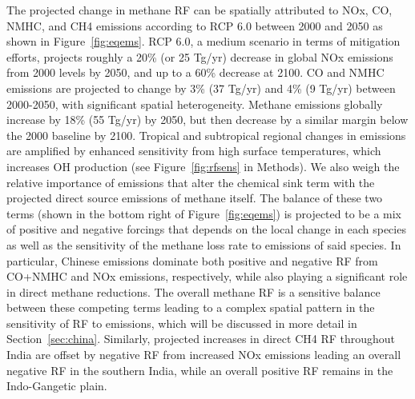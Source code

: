 The projected change in methane RF can be spatially attributed to NOx, CO, NMHC, and CH4 emissions according to RCP 6.0 between 2000 and 2050 as shown in Figure~\ref{fig:eqems}. RCP 6.0, a medium scenario in terms of mitigation efforts, projects roughly a 20\% (or 25 Tg/yr) decrease in global NOx emissions from 2000 levels by 2050, and up to a 60\% decrease at 2100. CO and NMHC emissions are projected to change by 3\% (37 Tg/yr) and 4\% (9 Tg/yr) between 2000-2050, with significant spatial heterogeneity. Methane emissions globally increase by 18\% (55 Tg/yr) by 2050, but then decrease by a similar margin below the 2000 baseline by 2100. Tropical and subtropical regional changes in emissions are amplified by enhanced sensitivity from high surface temperatures, which increases OH production (see Figure~\ref{fig:rfsens} in Methods). We also weigh the relative importance of emissions that alter the chemical sink term with the projected direct source emissions of methane itself. The balance of these two terms (shown in the bottom right of Figure~\ref{fig:eqems}) is projected to be a mix of positive and negative forcings that depends on the local change in each species as well as the sensitivity of the methane loss rate to emissions of said species. In particular, Chinese emissions dominate both positive and negative RF from CO+NMHC and NOx emissions, respectively, while also playing a significant role in direct methane reductions.  The overall methane RF is a sensitive balance between these competing terms leading to a complex spatial pattern in the sensitivity of RF to emissions, which will be discussed in more detail in Section~\ref{sec:china}.  Similarly, projected increases in direct CH4 RF throughout India are offset by negative RF from increased NOx emissions leading an overall negative RF in the southern India, while an overall positive RF remains in the Indo-Gangetic plain.  

